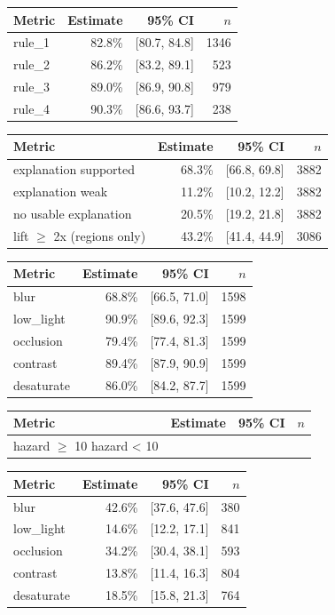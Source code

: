\begin{tabular}{lrrr}
\toprule
Metric & Estimate & 95\% CI & $n$ \\
\midrule
rule\_1 & 82.8\% & [80.7, 84.8] & 1346 \\
rule\_2 & 86.2\% & [83.2, 89.1] & 523 \\
rule\_3 & 89.0\% & [86.9, 90.8] & 979 \\
rule\_4 & 90.3\% & [86.6, 93.7] & 238 \\
\bottomrule
\end{tabular}

\begin{tabular}{lrrr}
\toprule
Metric & Estimate & 95\% CI & $n$ \\
\midrule
explanation supported & 68.3\% & [66.8, 69.8] & 3882 \\
explanation weak & 11.2\% & [10.2, 12.2] & 3882 \\
no usable explanation & 20.5\% & [19.2, 21.8] & 3882 \\
lift $\geq$ 2x (regions only) & 43.2\% & [41.4, 44.9] & 3086 \\
\bottomrule
\end{tabular}

\begin{tabular}{lrrr}
\toprule
Metric & Estimate & 95\% CI & $n$ \\
\midrule
blur & 68.8\% & [66.5, 71.0] & 1598 \\
low\_light & 90.9\% & [89.6, 92.3] & 1599 \\
occlusion & 79.4\% & [77.4, 81.3] & 1599 \\
contrast & 89.4\% & [87.9, 90.9] & 1599 \\
desaturate & 86.0\% & [84.2, 87.7] & 1599 \\
\bottomrule
\end{tabular}

\begin{tabular}{lrrr}
\toprule
Metric & Estimate & 95\% CI & $n$ \\
\midrule
hazard $\geq$ 10%
hazard < 10%
\bottomrule
\end{tabular}

\begin{tabular}{lrrr}
\toprule
Metric & Estimate & 95\% CI & $n$ \\
\midrule
blur & 42.6\% & [37.6, 47.6] & 380 \\
low\_light & 14.6\% & [12.2, 17.1] & 841 \\
occlusion & 34.2\% & [30.4, 38.1] & 593 \\
contrast & 13.8\% & [11.4, 16.3] & 804 \\
desaturate & 18.5\% & [15.8, 21.3] & 764 \\
\bottomrule
\end{tabular}

